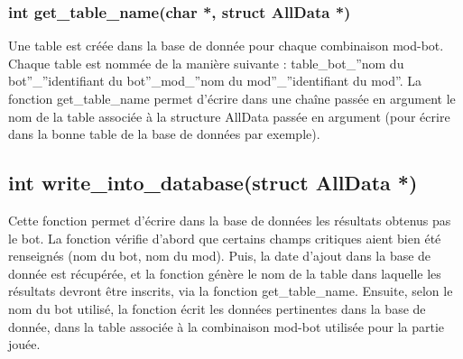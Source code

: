 \subsubsection*{int get\_table\_name(char *, struct AllData *)}
Une table est créée dans la base de donnée pour chaque combinaison mod-bot. Chaque table est nommée de la manière suivante : table\_bot\_''nom du bot''\_''identifiant du bot''\_mod\_''nom du mod''\_''identifiant du mod''. La fonction get\_table\_name permet d'écrire dans une chaîne passée en argument le nom de la table associée à la structure AllData passée en argument (pour écrire dans la bonne table de la base de données par exemple).
\subsection*{int write\_into\_database(struct AllData *)}
Cette fonction permet d'écrire dans la base de données les résultats obtenus pas le bot. La fonction vérifie d'abord que certains champs critiques aient bien été renseignés (nom du bot, nom du mod). Puis, la date d'ajout dans la base de donnée est récupérée, et la fonction génère le nom de la table dans laquelle les résultats devront être inscrits, via la fonction get\_table\_name. Ensuite, selon le nom du bot utilisé, la fonction écrit les données pertinentes dans la base de donnée, dans la table associée à la combinaison mod-bot utilisée pour la partie jouée.
